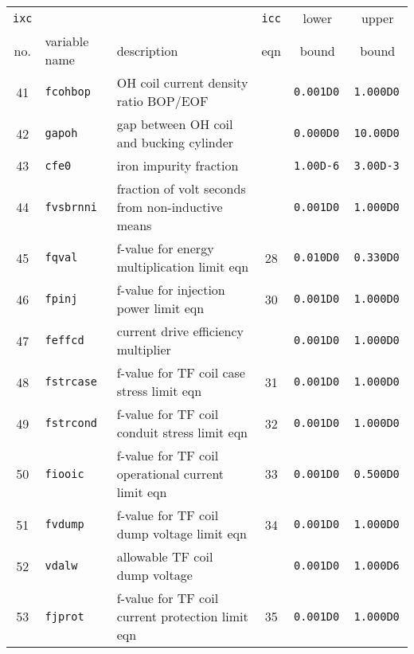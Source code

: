 \begin{table}[tbph]
\footnotesize
\begin{center}

\begin{tabular}{||c|l|l|c|c|c||} \hline
{\tt ixc} &           &                                                         & {\tt icc} & lower        & upper       \\
no. & variable name   & description                                             & eqn       & bound        & bound       \\ \hline
41  & \tt fcohbop     & OH coil current density ratio BOP/EOF                   &           & \tt 0.001D0  & \tt 1.000D0 \\
42  & \tt gapoh       & gap between OH coil and bucking cylinder                &           & \tt 0.000D0  & \tt 10.00D0 \\
43  & \tt cfe0        & iron impurity fraction                                  &           & \tt 1.00D-6  & \tt 3.00D-3 \\
44  & \tt fvsbrnni    & fraction of volt seconds from non-inductive means       &           & \tt 0.001D0  & \tt 1.000D0 \\
45  & \tt fqval       & f-value for energy multiplication limit eqn             & 28        & \tt 0.010D0  & \tt 0.330D0 \\
46  & \tt fpinj       & f-value for injection power limit eqn                   & 30        & \tt 0.001D0  & \tt 1.000D0 \\
47  & \tt feffcd      & current drive efficiency multiplier                     &           & \tt 0.001D0  & \tt 1.000D0 \\
48  & \tt fstrcase    & f-value for TF coil case stress limit eqn               & 31        & \tt 0.001D0  & \tt 1.000D0 \\
49  & \tt fstrcond    & f-value for TF coil conduit stress limit eqn            & 32        & \tt 0.001D0  & \tt 1.000D0 \\
50  & \tt fiooic      & f-value for TF coil operational current limit eqn       & 33        & \tt 0.001D0  & \tt 0.500D0 \\
51  & \tt fvdump      & f-value for TF coil dump voltage limit eqn              & 34        & \tt 0.001D0  & \tt 1.000D0 \\
52  & \tt vdalw       & allowable TF coil dump voltage                          &           & \tt 0.001D0  & \tt 1.000D6 \\
53  & \tt fjprot      & f-value for TF coil current protection limit eqn        & 35        & \tt 0.001D0  & \tt 1.000D0 \\

\end{tabular}
\end{center}
\end{table}
